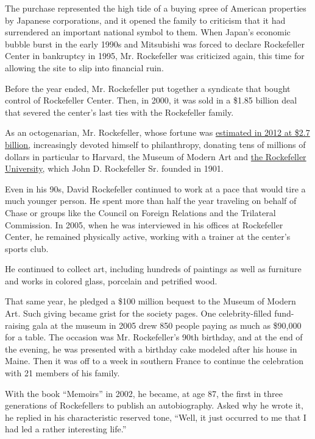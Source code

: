 The purchase represented the high tide of a buying spree of American
properties by Japanese corporations, and it opened the family to
criticism that it had surrendered an important national symbol to them.
When Japan's economic bubble burst in the early 1990s and Mitsubishi was
forced to declare Rockefeller Center in bankruptcy in 1995, Mr.
Rockefeller was criticized again, this time for allowing the site to
slip into financial ruin.

Before the year ended, Mr. Rockefeller put together a syndicate that
bought control of Rockefeller Center. Then, in 2000, it was sold in a
\$1.85 billion deal that severed the center's last ties with the
Rockefeller family.

As an octogenarian, Mr. Rockefeller, whose fortune was
\href{http://www.forbes.com/profile/david-rockefeller/}{estimated in
2012 at \$2.7 billion,} increasingly devoted himself to philanthropy,
donating tens of millions of dollars in particular to Harvard, the
Museum of Modern Art and
\href{http://www.rockefeller.edu/about/history}{the Rockefeller
University}, which John D. Rockefeller Sr. founded in 1901.

Even in his 90s, David Rockefeller continued to work at a pace that
would tire a much younger person. He spent more than half the year
traveling on behalf of Chase or groups like the Council on Foreign
Relations and the Trilateral Commission. In 2005, when he was
interviewed in his offices at Rockefeller Center, he remained physically
active, working with a trainer at the center's sports club.

He continued to collect art, including hundreds of paintings as well as
furniture and works in colored glass, porcelain and petrified wood.

That same year, he pledged a \$100 million bequest to the Museum of
Modern Art. Such giving became grist for the society pages. One
celebrity-filled fund-raising gala at the museum in 2005 drew 850 people
paying as much as \$90,000 for a table. The occasion was Mr.
Rockefeller's 90th birthday, and at the end of the evening, he was
presented with a birthday cake modeled after his house in Maine. Then it
was off to a week in southern France to continue the celebration with 21
members of his family.

With the book ``Memoirs'' in 2002, he became, at age 87, the first in
three generations of Rockefellers to publish an autobiography. Asked why
he wrote it, he replied in his characteristic reserved tone, ``Well, it
just occurred to me that I had led a rather interesting life.''

